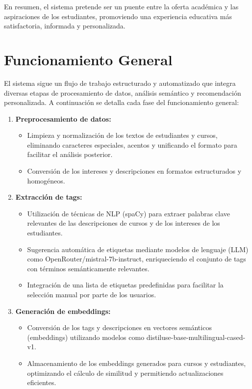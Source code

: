 \documentclass[12pt]{article}
\begin{document}
En resumen, el sistema pretende ser un puente entre la oferta académica y las aspiraciones de los estudiantes, promoviendo una experiencia educativa más satisfactoria, informada y personalizada.

\section{Funcionamiento General}
El sistema sigue un flujo de trabajo estructurado y automatizado que integra diversas etapas de procesamiento de datos, análisis semántico y recomendación personalizada. A continuación se detalla cada fase del funcionamiento general:

\begin{enumerate}
    \item \textbf{Preprocesamiento de datos:}
    \begin{itemize}
        \item Limpieza y normalización de los textos de estudiantes y cursos, eliminando caracteres especiales, acentos y unificando el formato para facilitar el análisis posterior.
        \item Conversión de los intereses y descripciones en formatos estructurados y homogéneos.
    \end{itemize}
    \item \textbf{Extracción de tags:}
    \begin{itemize}
        \item Utilización de técnicas de NLP (spaCy) para extraer palabras clave relevantes de las descripciones de cursos y de los intereses de los estudiantes.
        \item Sugerencia automática de etiquetas mediante modelos de lenguaje (LLM) como OpenRouter/mistral-7b-instruct, enriqueciendo el conjunto de tags con términos semánticamente relevantes.
        \item Integración de una lista de etiquetas predefinidas para facilitar la selección manual por parte de los usuarios.
    \end{itemize}
    \item \textbf{Generación de embeddings:}
    \begin{itemize}
        \item Conversión de los tags y descripciones en vectores semánticos (embeddings) utilizando modelos como distiluse-base-multilingual-cased-v1.
        \item Almacenamiento de los embeddings generados para cursos y estudiantes, optimizando el cálculo de similitud y permitiendo actualizaciones eficientes.

\end{itemize}
\end{enumerate}
\end{document}
